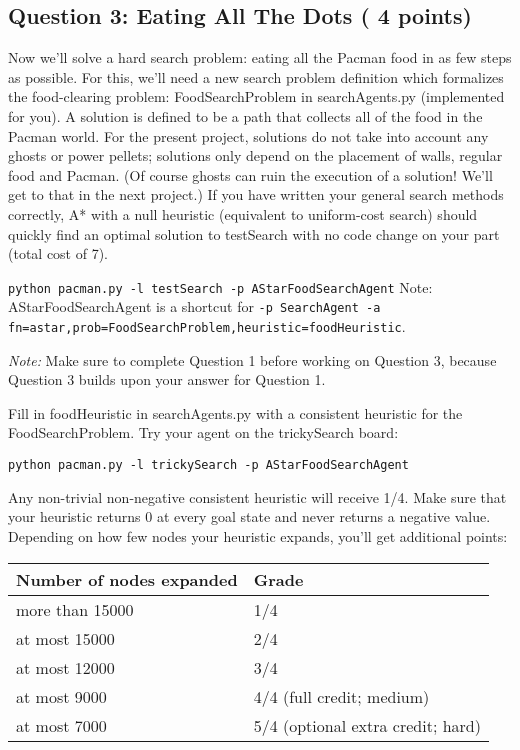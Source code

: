 \documentclass[a4paper, 11pt]{article}
\begin{document}
\subsection{Question 3: Eating All The Dots ( 4 points)}
Now we'll solve a hard search problem: eating all the Pacman food in as few steps as possible. For this, we'll need a new search problem definition which formalizes the food-clearing problem: \textsf{FoodSearchProblem} in \textsf{searchAgents.py} (implemented for you). A solution is defined to be a path that collects all of the food in the Pacman world. For the present project, solutions do not take into account any ghosts or power pellets; solutions only depend on the placement of walls, regular food and Pacman. (Of course ghosts can ruin the execution of a solution! We'll get to that in the next project.) If you have written your general search methods correctly, A* with a null heuristic (equivalent to uniform-cost search) should quickly find an optimal solution to testSearch with no code change on your part (total cost of 7).

\texttt{python pacman.py -l testSearch -p AStarFoodSearchAgent}
Note: AStarFoodSearchAgent is a shortcut for \texttt{-p SearchAgent -a fn=astar,prob=FoodSearchProblem,heuristic=foodHeuristic}.

\textit{Note:} Make sure to complete Question 1 before working on Question 3, because Question 3 builds upon your answer for Question 1.

Fill in \textsf{foodHeuristic} in \textsf{searchAgents.py} with a consistent heuristic for the \textsf{FoodSearchProblem}. Try your agent on the \textsf{trickySearch board}:

\texttt{python pacman.py -l trickySearch -p AStarFoodSearchAgent}

Any non-trivial non-negative consistent heuristic will receive 1/4. Make sure that your heuristic returns 0 at every goal state and never returns a negative value. Depending on how few nodes your heuristic expands, you'll get additional points:

\begin{center}
\begin{tabular}{||l||l||}
  \hline\hline
  Number of nodes expanded & Grade\\
  \hline\hline
  more than 15000 & 1/4\\
  \hline\hline
  at most 15000 & 2/4\\
  \hline\hline
  at most 12000 & 3/4\\
  \hline\hline
  at most 9000 & 4/4 (full credit; medium)\\
  \hline\hline
  at most 7000 & 5/4 (optional extra credit; hard)\\
  \hline\hline
\end{tabular}
\end{center}
\newpage
\end{document}

